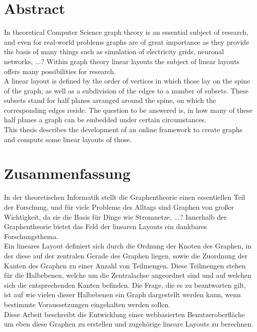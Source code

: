 \documentclass[twoside,12pt,a4paper]{report}
\begin{document}

\setcounter{page}{1}



\section*{Abstract}
In theoretical Computer Science graph theory is an essential subject of research, and even for real-world problems graphs are of great importance as they provide the basis of many things such as simulation of electricity grids, neuronal networks, ...?
Within graph theory linear layouts the subject of linear layouts offers many possibilities for research.\\
A linear layout is defined by the order of vertices in which those lay on the spine of the graph, as well as a subdivision of the edges to a number of subsets. These subsets stand for half planes arranged around the spine, on which the corresponding edges reside. The question to be answered is, in how many of these half planes a graph can be embedded under certain circumstances.\\
This thesis describes the development of an online framework to create graphs and compute some linear layouts of those.

\newpage
\section*{Zusammenfassung}
In der theoretischen Informatik stellt die Graphentheorie einen essentiellen Teil der Forschung, und für viele Probleme des Alltags sind Graphen von großer Wichtigkeit, da sie die Basis für Dinge wie Stromnetze, ...?
Innerhalb der Graphentheorie bietet das Feld der linearen Layouts ein dankbares Forschungsthema.\\
Ein lineares Layout definiert sich durch die Ordnung der Knoten des Graphen, in der diese auf der zentralen Gerade des Graphen liegen, sowie die Zuordnung der Kanten des Graphen zu einer Anzahl von Teilmengen. Diese Teilmengen stehen für die Halbebenen, welche um die Zentralachse angeordnet sind und auf welchen sich die entsprechenden Kanten befinden. Die Frage, die es zu beantworten gilt, ist auf wie vielen dieser Halbebenen ein Graph dargestellt werden kann, wenn bestimmte Voraussetzungen eingehalten werden sollen.\\
Diese Arbeit beschreibt die Entwicklung einer webbasierten Benutzeroberfläche um eben diese Graphen zu erstellen und zugehörige lineare Layouts zu berechnen.
\newpage
\end{document}
